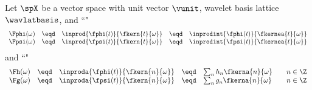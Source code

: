 \begin{theorem}
\label{thm:Phi=HPhi}
\raggedright
Let $\spX$ be a vector space with unit vector $\vunit$,
wavelet basis lattice $\wavlatbasis$,
and ``"
\[ \begin{array}{rcl cl}
     \Fphi(\omega) &\eqd& \inprod{\fphi(t)}{\fkern{t}{\omega}}
                   &\eqd& \inprodint{\fphi(t)}{\fkernea{t}{\omega}}
     \\
     \Fpsi(\omega) &\eqd& \inprod{\fpsi(t)}{\fkern{t}{\omega}}
                   &\eqd& \inprodint{\fpsi(t)}{ \fkernea{t}{\omega}}
\end{array} \]
and ``"
\[ \begin{array}{rcl cl @{\qquad}l}
     \Fh(\omega) &\eqd& \inproda{\fphi(t)}{\fkern{n}{\omega}}
                 &\eqd& \sum_n h_n \fkerna{n}{\omega}
                 &      n \in\Z
     \\
     \Fg(\omega) &\eqd& \inproda{\fpsi(t)}{\fkern{n}{\omega}}
                 &\eqd& \sum_n g_n \fkerna{n}{\omega} 
                 &      n \in\Z
\end{array} \]
\end{theorem}
